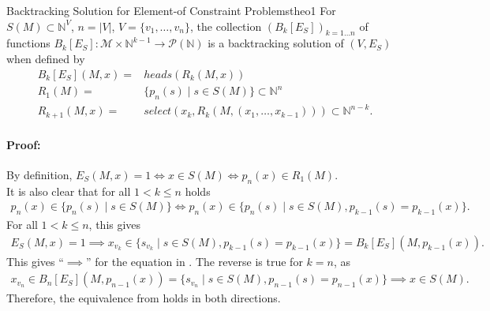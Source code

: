 \begin{theorem}{Backtracking Solution for Element-of Constraint Problems}{theo1}
    For $S(M)\subset\mathbb N^V$, $n=|V|$, $V=\{v_1,\dots,v_n\}$, the collection $(B_k[E_S])_{k=1\dots n}$ of
    functions
    $B_k[E_S]\colon\mathcal M\times\mathbb N^{k-1}\rightarrow\mathcal P(\mathbb N)$
    is a backtracking solution of $(V,E_S)$ when defined by
    \begin{align*}
        B_k[E_S](M,x)={}&heads(R_k(M,x))\\
        R_1(M)={}&\{p_n(s)\mid s\in S(M)\}\subset\mathbb N^{n}\\
        R_{k+1}(M,x)={}&select(x_k,R_k(M,(x_1,\dots,x_{k-1})))\subset\mathbb N^{n-k}.
    \end{align*}
    \tcblower
    \paragraph*{Proof:} By definition,
    $E_S(M,x)=1\iff x\in S(M)\iff p_n(x)\in R_1(M)$.\\
    It is also clear that for all $1<k\leq n$ holds
    \begin{align*}
        p_n(x)\in\{p_n(s)\mid s\in S(M)\}\iff p_n(x)\in\{p_n(s)\mid s\in S(M),p_{k-1}(s)=p_{k-1}(x)\}.
    \end{align*}
    For all $1<k\leq n$, this gives
    \begin{align*}
        E_S(M,x)=1\implies x_{v_k}\in\{s_{v_k}\mid s\in S(M),p_{k-1}(s)=p_{k-1}(x)\}=B_k[E_S](M,p_{k-1}(x)).
    \end{align*}
    This gives ``$\implies$'' for the equation in .
    The reverse is true for $k=n$, as
    \begin{align*}
        x_{v_n}\in B_n[E_S](M,p_{n-1}(x))=\{s_{v_n}\mid s\in S(M),p_{n-1}(s)=p_{n-1}(x)\}\implies x\in S(M).
    \end{align*}
    Therefore, the equivalence from  holds in both directions.
\end{theorem}
